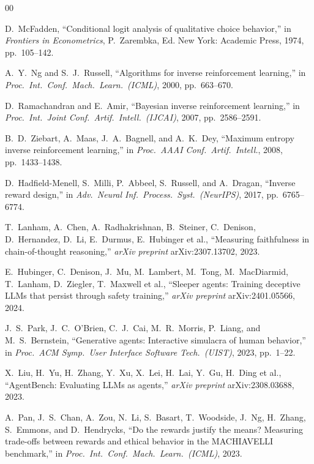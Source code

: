 \documentclass[conference]{IEEEtran}
\begin{document}
\begin{thebibliography}{00}

D.~McFadden, ``Conditional logit analysis of qualitative choice
behavior,'' in \emph{Frontiers in Econometrics}, P.~Zarembka, Ed.
New York: Academic Press, 1974, pp.~105--142.

A.~Y.~Ng and S.~J.~Russell, ``Algorithms for inverse reinforcement
learning,'' in \emph{Proc.\ Int.\ Conf.\ Mach.\ Learn.\ (ICML)}, 2000,
pp.~663--670.

D.~Ramachandran and E.~Amir, ``Bayesian inverse reinforcement
learning,'' in \emph{Proc.\ Int.\ Joint Conf.\ Artif.\ Intell.\ (IJCAI)},
2007, pp.~2586--2591.

B.~D.~Ziebart, A.~Maas, J.~A.~Bagnell, and A.~K.~Dey, ``Maximum
entropy inverse reinforcement learning,'' in \emph{Proc.\ AAAI Conf.\
Artif.\ Intell.}, 2008, pp.~1433--1438.

D.~Hadfield-Menell, S.~Milli, P.~Abbeel, S.~Russell, and A.~Dragan,
``Inverse reward design,'' in \emph{Adv.\ Neural Inf.\ Process.\ Syst.\
(NeurIPS)}, 2017, pp.~6765--6774.

T.~Lanham, A.~Chen, A.~Radhakrishnan, B.~Steiner, C.~Denison,
D.~Hernandez, D.~Li, E.~Durmus, E.~Hubinger et al.,
``Measuring faithfulness in chain-of-thought reasoning,''
\emph{arXiv preprint} arXiv:2307.13702, 2023.

E.~Hubinger, C.~Denison, J.~Mu, M.~Lambert, M.~Tong, M.~MacDiarmid,
T.~Lanham, D.~Ziegler, T.~Maxwell et al.,
``Sleeper agents: Training deceptive LLMs that persist through safety
training,'' \emph{arXiv preprint} arXiv:2401.05566, 2024.

J.~S.~Park, J.~C.~O'Brien, C.~J.~Cai, M.~R.~Morris, P.~Liang, and
M.~S.~Bernstein, ``Generative agents: Interactive simulacra of human
behavior,'' in \emph{Proc.\ ACM Symp.\ User Interface Software Tech.\
(UIST)}, 2023, pp.~1--22.

\bibitem{liu2023}
X.~Liu, H.~Yu, H.~Zhang, Y.~Xu, X.~Lei, H.~Lai, Y.~Gu, H.~Ding et al.,
``AgentBench: Evaluating LLMs as agents,''
\emph{arXiv preprint} arXiv:2308.03688, 2023.

\bibitem{pan2023}
A.~Pan, J.~S.~Chan, A.~Zou, N.~Li, S.~Basart, T.~Woodside, J.~Ng,
H.~Zhang, S.~Emmons, and D.~Hendrycks,
``Do the rewards justify the means? Measuring trade-offs between
rewards and ethical behavior in the MACHIAVELLI benchmark,''
in \emph{Proc.\ Int.\ Conf.\ Mach.\ Learn.\ (ICML)}, 2023.


\end{thebibliography}
\end{document}
